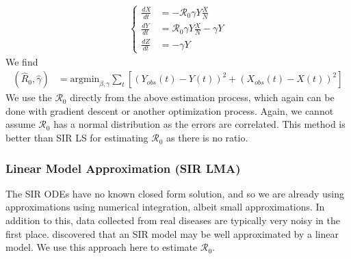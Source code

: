 \documentclass[12pt]{article}
\newcommand{\rr}{\ensuremath{\mathcal{R}_0}}
\begin{document}
\begin{align*}
  \left \{
  \begin{array}{cl}
    \frac{dX}{dt} &= - \rr \gamma Y \frac{X}{N}\\
    \frac{dY}{dt} &=  \rr \gamma Y \frac{X}{N}  - \gamma Y \\
    \frac{dZ}{dt} &=  - \gamma Y 
  \end{array}
  \right .
  \end{align*}
We find
\begin{align*}
(\hat{R}_0, \hat{\gamma} ) &= \text{argmin}_{\beta, \gamma} \sum_{t} \left [ \left (Y_{obs}(t) - Y(t)\right )^2 + \left ( X_{obs}(t) - X(t) \right )^2 \right ]
\end{align*}
We use the \(\rr\) directly from the above estimation process, which again can be done with gradient descent or another optimization process.  Again, we cannot assume $\rr$ has a normal distribution as the errors are correlated.  This method is better than SIR LS for estimating $\rr$ as there is no ratio.



\subsubsection{Linear Model Approximation (SIR LMA)}\label{linear-model-approximation-degree-10}

The SIR ODEs have no known closed form solution, and so we are already using approximations using numerical integration, albeit small approximations.  In addition to this, data collected from real diseases are typically very noisy in the first place.  \cite{chang2017} discovered that an SIR model may be well approximated by a linear model.  We use this approach here to estimate $\rr$.
\end{document}
